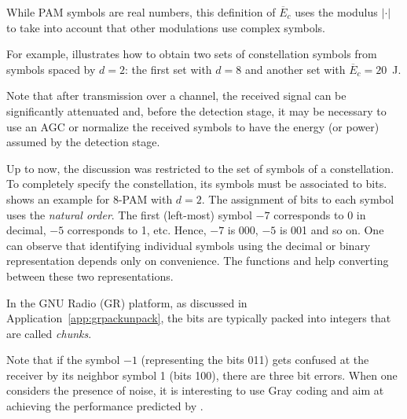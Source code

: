 While PAM symbols are real numbers, this definition of $\overline E_c$ uses the modulus $| \cdot |$ to take into account that other modulations use complex symbols.

For example,  illustrates how to obtain two sets of constellation symbols from symbols spaced by $d = 2$: the first set  with $d = 8$ and another set  with $\overline E_c=20$~J.

Note that after transmission over a channel, the received signal can be significantly attenuated and, before the detection stage, it may be necessary to use an AGC or normalize the received symbols to have the energy (or power) assumed by the detection stage.

Up to now, the discussion was restricted to the set of symbols of a constellation. To completely specify the constellation, its symbols must be associated to bits.
 shows an example for 8-PAM with $d = 2$.
The assignment of bits to each symbol uses the \emph{natural order}. The first (left-most) symbol $-7$ corresponds to 0 in decimal, $-5$ corresponds to 1, etc. Hence, $-7$ is 000, $-5$ is 001 and so on. One can observe that identifying individual symbols using the decimal or binary representation depends only on convenience. The {\matlab} functions  and  help converting between these two representations. 

In the GNU Radio (GR) platform, as discussed in Application~\ref{app:grpackunpack}, the bits are typically packed into integers that are called \emph{chunks}.

Note that if the symbol $-1$ (representing the bits 011) gets confused at the receiver by its neighbor symbol 1 (bits 100), there are three bit errors. When one considers the presence of noise, it is interesting to use Gray coding and aim at achieving the performance predicted by .

